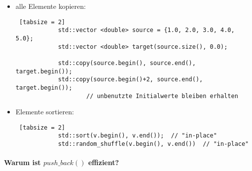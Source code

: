 \documentclass{article}
\begin{document}
\begin{itemize}
\begin{lstlisting} [tabsize = 2]
	 		im Header <algorithm>
	 	\end{lstlisting}
	 	\item alle Elemente kopieren:
	 	\begin{lstlisting} [tabsize = 2]
	 		std::vector <double> source = {1.0, 2.0, 3.0, 4.0, 5.0};
	 		std::vector <double> target(source.size(), 0.0);
	 		
	 		std::copy(source.begin(), source.end(), target.begin());
	 		std::copy(source.begin()+2, source.end(), target.begin());  
			 		// unbenutzte Initialwerte bleiben erhalten
	 	\end{lstlisting}
	 	\item Elemente sortieren:
	 	\begin{lstlisting} [tabsize = 2]
	 		std::sort(v.begin(), v.end());  // "in-place"
	 		std::random_shuffle(v.begin(), v.end())  // "in-place"
	 	\end{lstlisting}
	 \end{itemize}
	 
	 \paragraph{Warum ist $push\_back()$ effizient?}
	 
\end{document}
